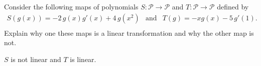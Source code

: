 
\begin{exerciseStatement}


Consider the following maps of polynomials \(S:\mathcal{P}\rightarrow\mathcal{P}\) and \(T:\mathcal{P}\rightarrow\mathcal{P}\) defined by 
\begin{align*} S(g(x))= -2 \, g\left(x\right) g'\left(x\right) + 4 \, g\left(x^{2}\right)  & \text{and} & T(g)= -x g\left(x\right) - 5 \, g'\left(1\right) . \\ \end{align*}
             Explain why one these maps is a linear transformation and why the other map is not. 


\end{exerciseStatement}
    
\begin{exerciseAnswer} 


\(S\) is not linear and \(T\) is linear.


\end{exerciseAnswer}
    
